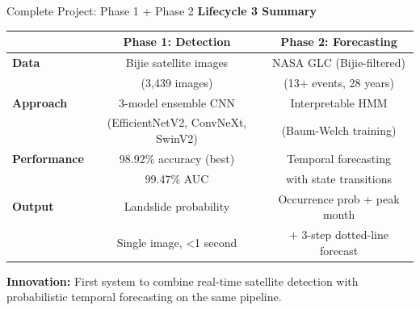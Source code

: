 \documentclass[aspectratio=169]{beamer}
\begin{document}
\begin{frame}{Complete Project: Phase 1 + Phase 2}
    \textbf{Lifecycle 3 Summary}

    \vspace{0.3cm}
    \begin{tabular}{lcc}
        \toprule
        & \textbf{Phase 1: Detection} & \textbf{Phase 2: Forecasting} \\
        \midrule
        \textbf{Data} & Bijie satellite images & NASA GLC (Bijie-filtered) \\
        & (3,439 images) & (13+ events, 28 years) \\
        \textbf{Approach} & 3-model ensemble CNN & Interpretable HMM \\
        & (EfficientNetV2, ConvNeXt, SwinV2) & (Baum-Welch training) \\
        \textbf{Performance} & 98.92\% accuracy (best) & Temporal forecasting \\
        & 99.47\% AUC & with state transitions \\
        \textbf{Output} & Landslide probability & Occurrence prob + peak month \\
        & Single image, <1 second & + 3-step dotted-line forecast \\
        \bottomrule
    \end{tabular}

    \vspace{0.4cm}
    \textbf{Innovation:} First system to combine real-time satellite detection with probabilistic temporal forecasting on the same pipeline.
\end{frame}
\end{document}
